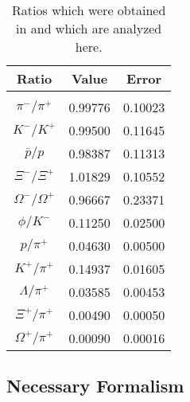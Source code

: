 \documentclass[12pt]{article}
\begin{document}
\begin{table}
\begin{center}
  \begin{tabular}{ccc}
          Ratio                                              &   Value         & Error     \\
          \hline \\
          $\pi^-/\pi^+$                                      &        0.99776  &   0.10023 \\
          $K^-/K^+$                                          &        0.99500  &   0.11645 \\
          $\bar{p}/p$                                        &        0.98387  &   0.11313 \\
          $\Xi^-/\Xi^+$                                      &        1.01829  &   0.10552 \\
          $\Omega^-/\Omega^+$                                &        0.96667  &   0.23371 \\
          $\phi/K^-$                                         &        0.11250  &   0.02500 \\
          $p/\pi^+$                                          &        0.04630  &   0.00500 \\
          $K^+/\pi^+$                                        &        0.14937  &   0.01605 \\
          $\Lambda/\pi^+$                                    &        0.03585  &   0.00453 \\
          $\Xi^+/\pi^+$                                      &        0.00490  &   0.00050 \\
          $\Omega^+/\pi^+$                                   &        0.00090  &   0.00016 \\

  \end{tabular}
  \caption{Ratios which were obtained in \cite{Bugaev:2016} and which   are  analyzed here.}
  \label{tab:rat_fit}
  \end{center}
\end{table}

\subsection{Necessary Formalism}
\end{document}
